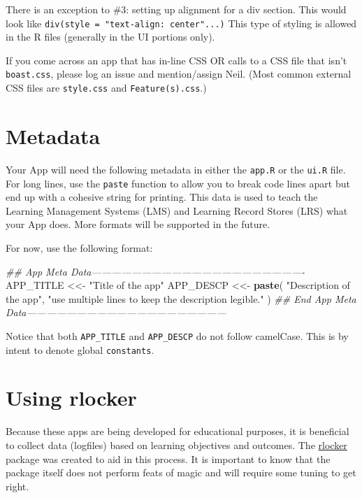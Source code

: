 \documentclass[
]{book}
\newenvironment{Shaded}{\begin{snugshade}}{\end{snugshade}}
\newcommand{\CommentTok}[1]{\textcolor[rgb]{0.56,0.35,0.01}{\textit{#1}}}
\newcommand{\KeywordTok}[1]{\textcolor[rgb]{0.13,0.29,0.53}{\textbf{#1}}}
\newcommand{\NormalTok}[1]{#1}
\newcommand{\StringTok}[1]{\textcolor[rgb]{0.31,0.60,0.02}{#1}}
\begin{document}
There is an exception to \#3: setting up alignment for a div section. This would look like \texttt{div(style\ =\ "text-align:\ center"...)} This type of styling is allowed in the R files (generally in the UI portions only).

If you come across an app that has in-line CSS OR calls to a CSS file that isn't \texttt{boast.css}, please log an issue and mention/assign Neil. (Most common external CSS files are \texttt{style.css} and \texttt{Feature(s).css}.)

\hypertarget{metadata}{%
\section{Metadata}\label{metadata}}

Your App will need the following metadata in either the \texttt{app.R} or the \texttt{ui.R} file. For long lines, use the \texttt{paste} function to allow you to break code lines apart but end up with a cohesive string for printing. This data is used to teach the Learning Management Systems (LMS) and Learning Record Stores (LRS) what your App does. More formats will be supported in the future.

For now, use the following format:

\begin{Shaded}
\begin{Highlighting}[]
\CommentTok{## App Meta Data----------------------------------------------------------------}
\NormalTok{APP_TITLE  <<-}\StringTok{ "Title of the app"}
\NormalTok{APP_DESCP  <<-}\StringTok{ }\KeywordTok{paste}\NormalTok{(}
  \StringTok{"Description of the app"}\NormalTok{,}
  \StringTok{"use multiple lines to keep the description legible."}
\NormalTok{)}
\CommentTok{## End App Meta Data------------------------------------------------------------}
\end{Highlighting}
\end{Shaded}

Notice that both \texttt{APP\_TITLE} and \texttt{APP\_DESCP} do not follow camelCase. This is by intent to denote global \texttt{constants}.

\hypertarget{rlocker}{%
\section{Using rlocker}\label{rlocker}}

Because these apps are being developed for educational purposes, it is beneficial to collect data (logfiles) based on learning objectives and outcomes. The \href{https://github.com/rpc5102/rlocker}{rlocker} package was created to aid in this process. It is important to know that the package itself does not perform feats of magic and will require some tuning to get right.
\end{document}
